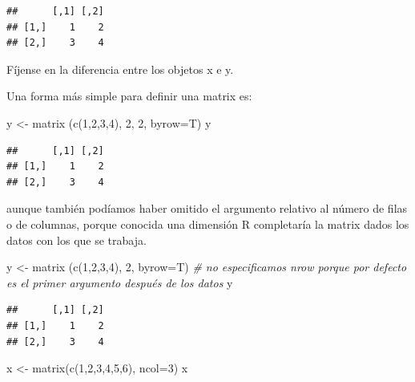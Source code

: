 \documentclass[
]{book}
\newenvironment{Shaded}{\begin{snugshade}}{\end{snugshade}}
\newcommand{\AttributeTok}[1]{\textcolor[rgb]{0.77,0.63,0.00}{#1}}
\newcommand{\CommentTok}[1]{\textcolor[rgb]{0.56,0.35,0.01}{\textit{#1}}}
\newcommand{\DecValTok}[1]{\textcolor[rgb]{0.00,0.00,0.81}{#1}}
\newcommand{\FunctionTok}[1]{\textcolor[rgb]{0.00,0.00,0.00}{#1}}
\newcommand{\NormalTok}[1]{#1}
\newcommand{\OtherTok}[1]{\textcolor[rgb]{0.56,0.35,0.01}{#1}}
\begin{document}
\begin{verbatim}
##      [,1] [,2]
## [1,]    1    2
## [2,]    3    4
\end{verbatim}

Fíjense en la diferencia entre los objetos x e y.

Una forma más simple para definir una matrix es:

\begin{Shaded}
\begin{Highlighting}[]
\NormalTok{y }\OtherTok{\textless{}{-}} \FunctionTok{matrix}\NormalTok{ (}\FunctionTok{c}\NormalTok{(}\DecValTok{1}\NormalTok{,}\DecValTok{2}\NormalTok{,}\DecValTok{3}\NormalTok{,}\DecValTok{4}\NormalTok{), }\DecValTok{2}\NormalTok{, }\DecValTok{2}\NormalTok{, }\AttributeTok{byrow=}\NormalTok{T)}
\NormalTok{y}
\end{Highlighting}
\end{Shaded}

\begin{verbatim}
##      [,1] [,2]
## [1,]    1    2
## [2,]    3    4
\end{verbatim}

aunque también podíamos haber omitido el argumento relativo al número de filas o de columnas, porque conocida una dimensión R completaría la matrix dados los datos con los que se trabaja.

\begin{Shaded}
\begin{Highlighting}[]
\NormalTok{y }\OtherTok{\textless{}{-}} \FunctionTok{matrix}\NormalTok{ (}\FunctionTok{c}\NormalTok{(}\DecValTok{1}\NormalTok{,}\DecValTok{2}\NormalTok{,}\DecValTok{3}\NormalTok{,}\DecValTok{4}\NormalTok{), }\DecValTok{2}\NormalTok{, }\AttributeTok{byrow=}\NormalTok{T)  }\CommentTok{\# no especificamos nrow porque por defecto es el primer argumento después de los datos}
\NormalTok{y}
\end{Highlighting}
\end{Shaded}

\begin{verbatim}
##      [,1] [,2]
## [1,]    1    2
## [2,]    3    4
\end{verbatim}

\begin{Shaded}
\begin{Highlighting}[]
\NormalTok{x }\OtherTok{\textless{}{-}} \FunctionTok{matrix}\NormalTok{(}\FunctionTok{c}\NormalTok{(}\DecValTok{1}\NormalTok{,}\DecValTok{2}\NormalTok{,}\DecValTok{3}\NormalTok{,}\DecValTok{4}\NormalTok{,}\DecValTok{5}\NormalTok{,}\DecValTok{6}\NormalTok{), }\AttributeTok{ncol=}\DecValTok{3}\NormalTok{)}
\NormalTok{x}
\end{Highlighting}
\end{Shaded}
\end{document}
